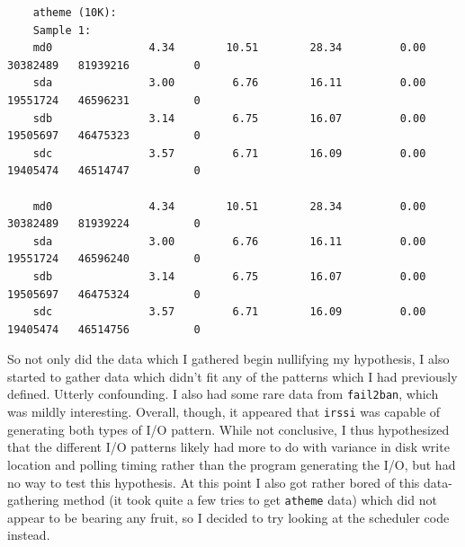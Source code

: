\documentclass{article}
\begin{document}
\begin{verbatim}
	atheme (10K):
	Sample 1:
	md0               4.34        10.51        28.34         0.00   30382489   81939216          0
	sda               3.00         6.76        16.11         0.00   19551724   46596231          0
	sdb               3.14         6.75        16.07         0.00   19505697   46475323          0
	sdc               3.57         6.71        16.09         0.00   19405474   46514747          0

	md0               4.34        10.51        28.34         0.00   30382489   81939224          0
	sda               3.00         6.76        16.11         0.00   19551724   46596240          0
	sdb               3.14         6.75        16.07         0.00   19505697   46475324          0
	sdc               3.57         6.71        16.09         0.00   19405474   46514756          0
\end{verbatim}
So not only did the data which I gathered begin nullifying my hypothesis, I also started to gather data which didn't fit any of the patterns which I had previously defined.  Utterly confounding.  I also had some rare data from \texttt{fail2ban}, which was mildly interesting.  Overall, though, it appeared that \texttt{irssi} was capable of generating both types of I/O pattern.  While not conclusive, I thus hypothesized that the different I/O patterns likely had more to do with variance in disk write location and polling timing rather than the program generating the I/O, but had no way to test this hypothesis.  At this point I also got rather bored of this data-gathering method (it took quite a few tries to get \texttt{atheme} data) which did not appear to be bearing any fruit, so I decided to try looking at the scheduler code instead.
\end{document}
